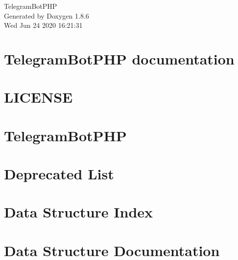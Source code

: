 \documentclass[twoside]{book}
\newcommand{\clearemptydoublepage}{%
  \newpage{\pagestyle{empty}\cleardoublepage}%
}
\begin{document}
\hypersetup{pageanchor=false}
\begin{titlepage}
\vspace*{7cm}
\begin{center}%
{\Large Telegram\-Bot\-P\-H\-P }\\
\vspace*{1cm}
{\large Generated by Doxygen 1.8.6}\\
\vspace*{0.5cm}
{\small Wed Jun 24 2020 16:21:31}\\
\end{center}
\end{titlepage}
\clearemptydoublepage
\tableofcontents
\clearemptydoublepage
{}
\hypersetup{pageanchor=true}

\chapter{Telegram\-Bot\-P\-H\-P documentation}
\label{index}\hypertarget{index}{}
\chapter{L\-I\-C\-E\-N\-S\-E}
\label{md__home_travis_build__eleirbag89__telegram_bot_p_h_p__l_i_c_e_n_s_e}
\hypertarget{md__home_travis_build__eleirbag89__telegram_bot_p_h_p__l_i_c_e_n_s_e}{}

\chapter{Telegram\-Bot\-P\-H\-P}
\label{md__home_travis_build__eleirbag89__telegram_bot_p_h_p__r_e_a_d_m_e}
\hypertarget{md__home_travis_build__eleirbag89__telegram_bot_p_h_p__r_e_a_d_m_e}{}

\chapter{Deprecated List}
\label{deprecated}
\hypertarget{deprecated}{}

\chapter{Data Structure Index}

\chapter{Data Structure Documentation}



\newpage
{}
{}
\printindex
\end{document}
